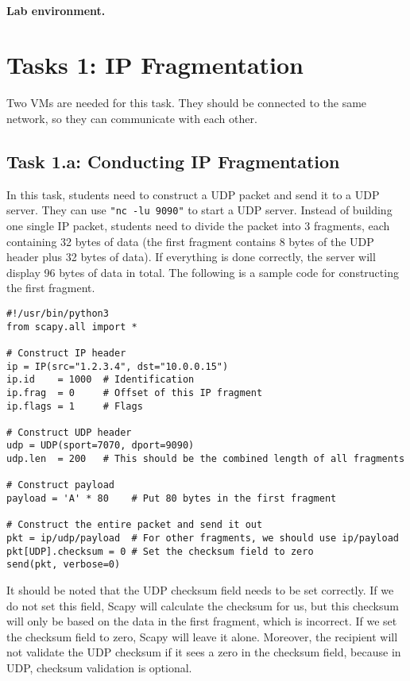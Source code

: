 \paragraph{Lab environment.} \seedenvironment


\section{Tasks 1: IP Fragmentation}

Two VMs are needed for this task. They should be connected to the same network, so they
can communicate with each other.

\subsection{Task 1.a: Conducting IP Fragmentation}

In this task, students need to construct a UDP packet and send it to a UDP 
server. They can use \texttt{"nc -lu 9090"} to start a UDP server. 
Instead of building one single IP packet, students need to 
divide the packet into 3 fragments, each containing 32 bytes of data (the
first fragment contains 8 bytes of the UDP header plus 32 bytes of data).
If everything is done correctly, the server will display
96 bytes of data in total.  
The following is a sample code for constructing the first fragment.

\begin{lstlisting}
#!/usr/bin/python3
from scapy.all import *

# Construct IP header
ip = IP(src="1.2.3.4", dst="10.0.0.15")
ip.id    = 1000  # Identification
ip.frag  = 0     # Offset of this IP fragment
ip.flags = 1     # Flags

# Construct UDP header
udp = UDP(sport=7070, dport=9090)
udp.len  = 200   # This should be the combined length of all fragments

# Construct payload
payload = 'A' * 80    # Put 80 bytes in the first fragment

# Construct the entire packet and send it out
pkt = ip/udp/payload  # For other fragments, we should use ip/payload
pkt[UDP].checksum = 0 # Set the checksum field to zero
send(pkt, verbose=0)
\end{lstlisting}


It should be noted that the UDP checksum field needs to be set 
correctly. If we do not set this field, Scapy will calculate 
the checksum for us, but this checksum will only be based on the 
data in the first fragment, which is incorrect.
If we set the checksum field to  zero, Scapy will leave it alone.
Moreover, the recipient will not validate the UDP checksum 
if it sees a zero in the checksum field, 
because in UDP, checksum validation is optional.



